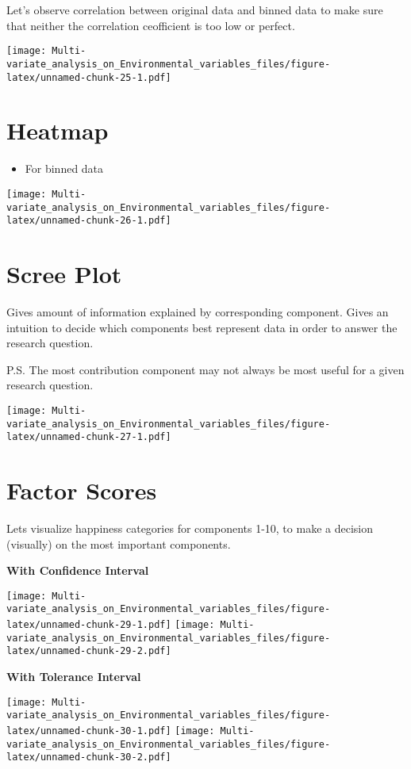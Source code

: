 \documentclass[]{book}
\providecommand{\tightlist}{%
  \setlength{\itemsep}{0pt}\setlength{\parskip}{0pt}}
\begin{document}
Let's observe correlation between original data and binned data to make
sure that neither the correlation ceofficient is too low or perfect.

\texttt{[image: Multi-variate\_analysis\_on\_Environmental\_variables\_files/figure-latex/unnamed-chunk-25-1.pdf]}

\hypertarget{heatmap}{%
\section{Heatmap}\label{heatmap}}

\begin{itemize}
\tightlist
\item
  For binned data
\end{itemize}

\texttt{[image: Multi-variate\_analysis\_on\_Environmental\_variables\_files/figure-latex/unnamed-chunk-26-1.pdf]}

\hypertarget{scree-plot-1}{%
\section{Scree Plot}\label{scree-plot-1}}

Gives amount of information explained by corresponding component. Gives
an intuition to decide which components best represent data in order to
answer the research question.

P.S. The most contribution component may not always be most useful for a
given research question.

\texttt{[image: Multi-variate\_analysis\_on\_Environmental\_variables\_files/figure-latex/unnamed-chunk-27-1.pdf]}

\hypertarget{factor-scores-1}{%
\section{Factor Scores}\label{factor-scores-1}}

Lets visualize happiness categories for components 1-10, to make a
decision (visually) on the most important components.

\textbf{With Confidence Interval}

\texttt{[image: Multi-variate\_analysis\_on\_Environmental\_variables\_files/figure-latex/unnamed-chunk-29-1.pdf]}
\texttt{[image: Multi-variate\_analysis\_on\_Environmental\_variables\_files/figure-latex/unnamed-chunk-29-2.pdf]}

\textbf{With Tolerance Interval}

\texttt{[image: Multi-variate\_analysis\_on\_Environmental\_variables\_files/figure-latex/unnamed-chunk-30-1.pdf]}
\texttt{[image: Multi-variate\_analysis\_on\_Environmental\_variables\_files/figure-latex/unnamed-chunk-30-2.pdf]}
\end{document}

